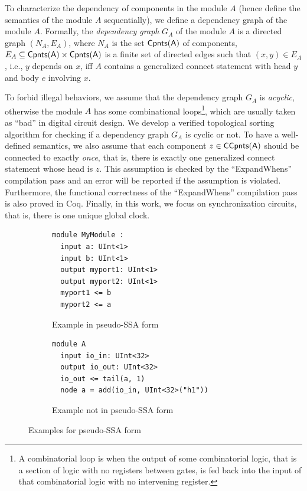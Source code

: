 To characterize the dependency of components in the module $A$ (hence define the semantics of the module $A$ sequentially), we define a dependency graph of the module $A$.
Formally, the \emph{dependency graph} $G_A$ of the module $A$ is a directed graph $(N_A, E_A)$, where $N_A$ is the set $\sf Cpnts(A)$ of components,
$E_A\subseteq \sf Cpnts(A)\times \sf Cpnts(A)$ is a finite set of directed edges such that
$(x, y)\in E_A$, i.e., $y$ depends on $x$, iff $A$ contains a generalized connect statement with head $y$ and body $e$ involving $x$.
%

To forbid illegal behaviors, we assume that the dependency graph $G_A$ is \emph{acyclic},
otherwise the module $A$ has some combinational loops\footnote{A combinatorial loop is when the output of some combinatorial logic, that is a section of logic with no registers between gates, is fed back into the input of that combinatorial logic with no intervening register.}, which are usually taken as ``bad'' in digital circuit design.
We develop a verified topological sorting algorithm for checking if a dependency graph $G_A$ is cyclic or not.
To have a well-defined semantics, we also assume that each component $z \in \sf CCpnts(A)$ should be connected to exactly \emph{once}, that is,
there is exactly one generalized connect statement whose head is $z$. This assumption
is checked by the ``ExpandWhens'' compilation pass and an error will be reported if the assumption
is violated. Furthermore, the functional correctness of the ``ExpandWhens'' compilation pass is also proved in Coq.
Finally, in this work, we focus on synchronization circuits, that is, there is one unique global clock.


\begin{figure}[!t]
\centering
\begin{subfigure}[b]{0.4\textwidth}
         \centering
\begin{lstlisting}
module MyModule :
  input a: UInt<1>
  input b: UInt<1>
  output myport1: UInt<1>
  output myport2: UInt<1>
  myport1 <= b
  myport2 <= a
\end{lstlisting}
\caption{Example in pseudo-SSA form}
\label{fig:exampleinSSA}
\end{subfigure}
\hspace{4mm}
\begin{subfigure}[b]{0.45\textwidth}
         \centering
\begin{lstlisting}
module A
  input io_in: UInt<32>
  output io_out: UInt<32>
  io_out <= tail(a, 1)
  node a = add(io_in, UInt<32>("h1"))
\end{lstlisting}
\caption{Example not in pseudo-SSA form}
\label{fig:examplenotinSSA}
\end{subfigure}
\caption{Examples for pseudo-SSA form}
\end{figure}



